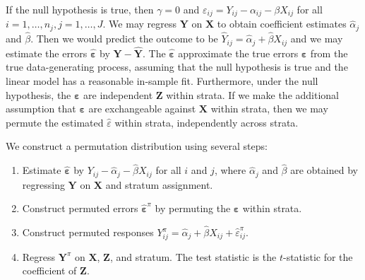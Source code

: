 \documentclass[11pt]{article}
\begin{document}
If the null hypothesis is true, then $\gamma = 0$ and $\varepsilon_{ij} = Y_{ij} - \alpha_{ij} - \beta X_{ij}$ for all $i = 1, \dots, n_j, j = 1, \dots, J$.
We may regress $\mathbf{Y}$ on $\mathbf{X}$ to obtain coefficient estimates $\hat{\alpha}_j$ and $\hat{\beta}$.
Then we would predict the outcome to be $\hat{Y}_{ij} = \hat{\alpha}_j + \hat{\beta}X_{ij}$
and we may estimate the errors $\mathbf{\hat{\varepsilon}}$ by $\mathbf{Y} - \mathbf{\hat{Y}}$.
The $\mathbf{\hat{\varepsilon}}$ approximate the true errors $\mathbf{\varepsilon}$ from the true data-generating process, assuming that the null hypothesis is true and the linear model has a reasonable in-sample fit.
Furthermore, under the null hypothesis, the $\mathbf{\varepsilon}$ are independent $\mathbf{Z}$ within strata. 
If we make the additional assumption that $\mathbf{\varepsilon}$ are exchangeable against $\mathbf{X}$ within strata, then 
we may permute the estimated $\hat{\varepsilon}$ within strata, independently across strata.

We construct a permutation distribution using several steps:

\begin{enumerate}
\item Estimate $\mathbf{\hat{\varepsilon}}$ by $Y_{ij} - \hat{\alpha}_j - \hat{\beta} X_{ij}$ for all $i$ and $j$, where $\hat{\alpha}_j$ and $\hat{\beta}$ are obtained by regressing $\mathbf{Y}$ on $\mathbf{X}$ and stratum assignment.
\item Construct permuted errors $\mathbf{\hat{\varepsilon}}^\pi$ by permuting the $\mathbf{\hat{\varepsilon}}$ within strata.
\item Construct permuted responses $Y_{ij}^\pi = \hat{\alpha}_j + \hat{\beta} X_{ij}+ \hat{\varepsilon}_{ij}^\pi$.
\item Regress $\mathbf{Y}^\pi$ on $\mathbf{X}$, $\mathbf{Z}$, and stratum. The test statistic is the $t$-statistic for the coefficient of $\mathbf{Z}$.
\end{enumerate}
\end{document}
